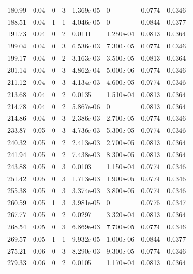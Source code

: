 \documentclass[preview]{standalone}
\begin{document}
{{{\begin{tabular}{L{1.2cm}C{1.2cm} C{0.3cm}C{0.5cm} C{1.4cm}C{1.4cm} C{1.4cm}C{1.4cm}}
  180.99  &  0.04  & 0     &  3 &  1.369e-05  & 0  & 0.0774 &  0.0346   \\ 
  188.51  &  0.04  & 1     &  1 &  4.046e-05  & 0  & 0.0844 &  0.0377   \\ 
  191.73  &  0.04  & 0     &  2 &  0.0111  & 1.250e-04  & 0.0813 &  0.0364   \\ 
  199.04  &  0.04  & 0     &  3 &  6.536e-03  & 7.300e-05  & 0.0774 &  0.0346   \\ 
  199.17  &  0.04  & 0     &  2 &  3.163e-03  & 3.500e-05  & 0.0813 &  0.0364   \\ 
  201.14  &  0.04  & 0     &  3 &  4.862e-04  & 5.000e-06  & 0.0774 &  0.0346   \\ 
  211.12  &  0.04  & 0     &  3 &  4.134e-03  & 4.600e-05  & 0.0774 &  0.0346   \\ 
  213.68  &  0.04  & 0     &  2 &  0.0135  & 1.510e-04  & 0.0813 &  0.0364   \\ 
  214.78  &  0.04  & 0     &  2 &  5.867e-06  & 0  & 0.0813 &  0.0364   \\ 
  214.86  &  0.04  & 0     &  3 &  2.386e-03  & 2.700e-05  & 0.0774 &  0.0346   \\ 
  233.87  &  0.05  & 0     &  3 &  4.736e-03  & 5.300e-05  & 0.0774 &  0.0346   \\ 
  240.32  &  0.05  & 0     &  2 &  2.413e-03  & 2.700e-05  & 0.0813 &  0.0364   \\ 
  241.94  &  0.05  & 0     &  2 &  7.438e-03  & 8.300e-05  & 0.0813 &  0.0364   \\ 
  243.88  &  0.05  & 0     &  3 &  0.0103  & 1.150e-04  & 0.0774 &  0.0346   \\ 
  251.42  &  0.05  & 0     &  3 &  1.713e-03  & 1.900e-05  & 0.0774 &  0.0346   \\ 
  255.38  &  0.05  & 0     &  3 &  3.374e-03  & 3.800e-05  & 0.0774 &  0.0346   \\ 
  260.59  &  0.05  & 1     &  3 &  3.981e-05  & 0  & 0.0775 &  0.0347   \\ 
  267.77  &  0.05  & 0     &  2 &  0.0297  & 3.320e-04  & 0.0813 &  0.0364   \\ 
  268.54  &  0.05  & 0     &  3 &  6.869e-03  & 7.700e-05  & 0.0774 &  0.0346   \\ 
  269.57  &  0.05  & 1     &  1 &  9.932e-05  & 1.000e-06  & 0.0844 &  0.0377   \\ 
  275.21  &  0.06  & 0     &  3 &  8.290e-03  & 9.300e-05  & 0.0774 &  0.0346   \\ 
  279.33  &  0.06  & 0     &  2 &  0.0105  & 1.170e-04  & 0.0813 &  0.0364   \\ 

\end{tabular}}}}
\end{document}
